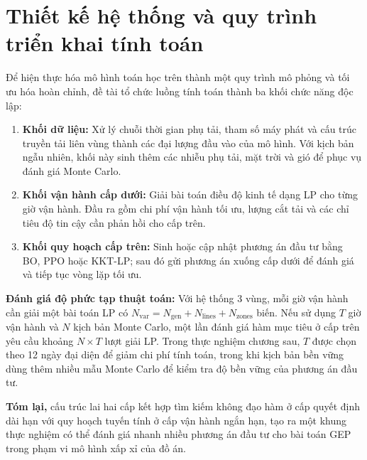 \section{Thiết kế hệ thống và quy trình triển khai tính toán}

Để hiện thực hóa mô hình toán học trên thành một quy trình mô phỏng và tối ưu hóa hoàn chỉnh, đề tài tổ chức luồng tính toán thành ba khối chức năng độc lập:

\begin{enumerate}
    \item \textbf{Khối dữ liệu:} Xử lý chuỗi thời gian phụ tải, tham số máy phát và cấu trúc truyền tải liên vùng thành các đại lượng đầu vào của mô hình. Với kịch bản ngẫu nhiên, khối này sinh thêm các nhiễu phụ tải, mặt trời và gió để phục vụ đánh giá Monte Carlo.
    \item \textbf{Khối vận hành cấp dưới:} Giải bài toán điều độ kinh tế dạng LP cho từng giờ vận hành. Đầu ra gồm chi phí vận hành tối ưu, lượng cắt tải và các chỉ tiêu độ tin cậy cần phản hồi cho cấp trên.
    \item \textbf{Khối quy hoạch cấp trên:} Sinh hoặc cập nhật phương án đầu tư bằng BO, PPO hoặc KKT-LP; sau đó gửi phương án xuống cấp dưới để đánh giá và tiếp tục vòng lặp tối ưu.
\end{enumerate}

\textbf{Đánh giá độ phức tạp thuật toán:} Với hệ thống 3 vùng, mỗi giờ vận hành cần giải một bài toán LP có $N_{\text{var}} = N_{\text{gen}} + N_{\text{lines}} + N_{\text{zones}}$ biến. Nếu sử dụng $T$ giờ vận hành và $N$ kịch bản Monte Carlo, một lần đánh giá hàm mục tiêu ở cấp trên yêu cầu khoảng $N \times T$ lượt giải LP. Trong thực nghiệm chương sau, $T$ được chọn theo 12 ngày đại diện để giảm chi phí tính toán, trong khi kịch bản bền vững dùng thêm nhiều mẫu Monte Carlo để kiểm tra độ bền vững của phương án đầu tư.

\vspace{1cm}
\textbf{Tóm lại,} cấu trúc lai hai cấp kết hợp tìm kiếm không đạo hàm ở cấp quyết định dài hạn với quy hoạch tuyến tính ở cấp vận hành ngắn hạn, tạo ra một khung thực nghiệm có thể đánh giá nhanh nhiều phương án đầu tư cho bài toán GEP trong phạm vi mô hình xấp xỉ của đồ án.
